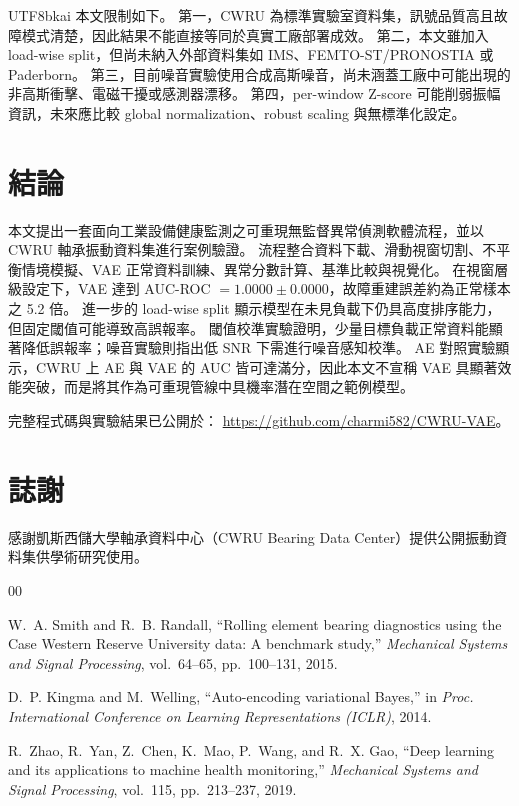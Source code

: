 \documentclass[conference]{IEEEtran}
\begin{document}
\begin{CJK}{UTF8}{bkai}
本文限制如下。
第一，CWRU 為標準實驗室資料集，訊號品質高且故障模式清楚，因此結果不能直接等同於真實工廠部署成效。
第二，本文雖加入 load-wise split，但尚未納入外部資料集如 IMS、FEMTO-ST/PRONOSTIA 或 Paderborn。
第三，目前噪音實驗使用合成高斯噪音，尚未涵蓋工廠中可能出現的非高斯衝擊、電磁干擾或感測器漂移。
第四，per-window Z-score 可能削弱振幅資訊，未來應比較 global normalization、robust scaling 與無標準化設定。

\section{結論}
本文提出一套面向工業設備健康監測之可重現無監督異常偵測軟體流程，並以 CWRU 軸承振動資料集進行案例驗證。
流程整合資料下載、滑動視窗切割、不平衡情境模擬、VAE 正常資料訓練、異常分數計算、基準比較與視覺化。
在視窗層級設定下，VAE 達到 AUC-ROC $=1.0000\pm0.0000$，故障重建誤差約為正常樣本之 5.2 倍。
進一步的 load-wise split 顯示模型在未見負載下仍具高度排序能力，但固定閾值可能導致高誤報率。
閾值校準實驗證明，少量目標負載正常資料能顯著降低誤報率；噪音實驗則指出低 SNR 下需進行噪音感知校準。
AE 對照實驗顯示，CWRU 上 AE 與 VAE 的 AUC 皆可達滿分，因此本文不宣稱 VAE 具顯著效能突破，而是將其作為可重現管線中具機率潛在空間之範例模型。

完整程式碼與實驗結果已公開於：
\url{https://github.com/charmi582/CWRU-VAE}。

\section*{誌謝}
感謝凱斯西儲大學軸承資料中心（CWRU Bearing Data Center）提供公開振動資料集供學術研究使用。

\begin{thebibliography}{00}

W.~A. Smith and R.~B. Randall,
``Rolling element bearing diagnostics using the Case Western Reserve University data: A benchmark study,''
\textit{Mechanical Systems and Signal Processing}, vol.~64--65, pp.~100--131, 2015.

D.~P. Kingma and M.~Welling,
``Auto-encoding variational Bayes,''
in \textit{Proc. International Conference on Learning Representations (ICLR)}, 2014.

R.~Zhao, R.~Yan, Z.~Chen, K.~Mao, P.~Wang, and R.~X. Gao,
``Deep learning and its applications to machine health monitoring,''
\textit{Mechanical Systems and Signal Processing}, vol.~115, pp.~213--237, 2019.


\end{thebibliography}
\end{CJK}
\end{document}
